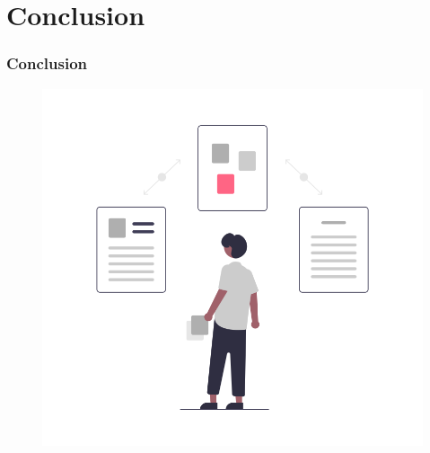 \documentclass[9pt]{beamer}
\begin{document}
\section{Conclusion}
\begin{frame}
	\frametitle{Conclusion}
	\begin{figure}[!htb]
     \centering
     \includegraphics[width=.7\textwidth]{../media/Process}
   \label{Fig:process}
\end{figure}
\end{frame}
\end{document}

